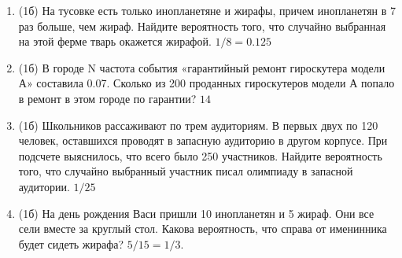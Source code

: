 \documentclass[a4paper, 12pt]{article}
\begin{document}
\begin{enumerate}
\item (1б) На тусовке есть только инопланетяне и жирафы, причем инопланетян в 7 раз больше, чем жираф. Найдите вероятность того, 
что случайно выбранная на этой ферме тварь окажется жирафой.
$1/8=0.125$

\item (1б) В городе N частота события «гарантийный ремонт гироскутера модели А» составила 0.07. 
Сколько из 200 проданных гироскутеров модели А попало в ремонт в этом городе по гарантии?
$14$

\item (1б) Школьников рассаживают по трем аудиториям. В первых двух по 120 человек, оставшихся проводят в запасную аудиторию в другом корпусе. 
При подсчете выяснилось, что всего было 250 участников. Найдите вероятность того, что случайно выбранный участник писал олимпиаду в запасной аудитории.
$1/25$


\item (1б) На день рождения Васи пришли 10 инопланетян и 5 жираф. Они все сели вместе за круглый стол. 
Какова вероятность, что справа от именинника будет сидеть жирафа? $5/15=1/3$.

        


\end{enumerate}
\end{document}
